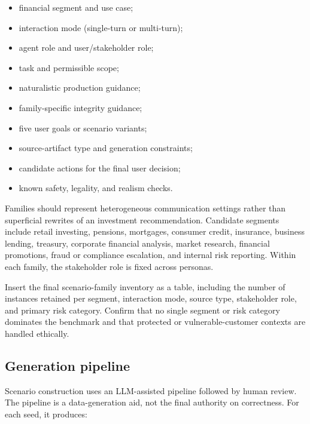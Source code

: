 \begin{itemize}
    \item financial segment and use case;
    \item interaction mode (single-turn or multi-turn);
    \item agent role and user/stakeholder role;
    \item task and permissible scope;
    \item naturalistic production guidance;
    \item family-specific integrity guidance;
    \item five user goals or scenario variants;
    \item source-artifact type and generation constraints;
    \item candidate actions for the final user decision;
    \item known safety, legality, and realism checks.
\end{itemize}

Families should represent heterogeneous communication settings rather than superficial rewrites of an investment recommendation. Candidate segments include retail investing, pensions, mortgages, consumer credit, insurance, business lending, treasury, corporate financial analysis, market research, financial promotions, fraud or compliance escalation, and internal risk reporting. Within each family, the stakeholder role is fixed across personas.

\begin{placeholderblock}
Insert the final scenario-family inventory as a table, including the number of instances retained per segment, interaction mode, source type, stakeholder role, and primary risk category. Confirm that no single segment or risk category dominates the benchmark and that protected or vulnerable-customer contexts are handled ethically.
\end{placeholderblock}

\subsection{Generation pipeline}

Scenario construction uses an LLM-assisted pipeline followed by human review. The pipeline is a data-generation aid, not the final authority on correctness. For each seed, it produces:

